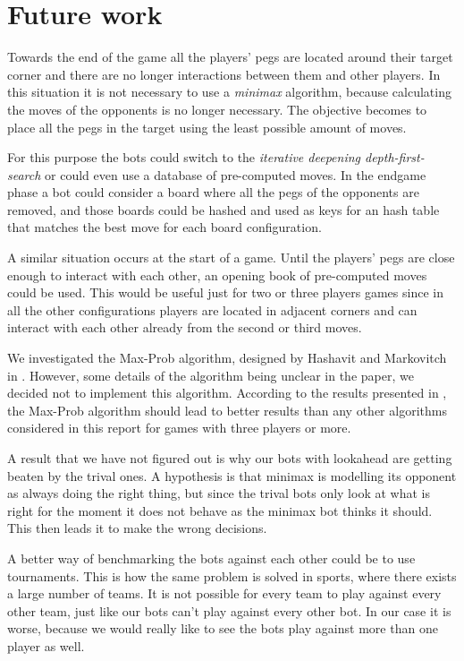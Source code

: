 
\section{Future work}

Towards the end of the game all the players' pegs are located around
their target corner and there are no longer interactions between them
and other players. In this situation it is not necessary to use a
\emph{minimax} algorithm, because calculating the moves of the
opponents is no longer necessary. The objective becomes to place
all the pegs in the target using the least possible amount of moves.

For this purpose the bots could switch to the \emph{iterative
  deepening depth-first-search} or could even use a database of
pre-computed moves. In the endgame phase a bot could consider a board
where all the pegs of the opponents are removed, and those boards
could be hashed and used as keys for an hash table that matches the
best move for each board configuration.

A similar situation occurs at the start of a game.
Until the players' pegs are close enough to interact with each other, an opening
book of pre-computed moves could be used. This would be useful just for two or
three players games since in all the other configurations players are located in
adjacent corners and can interact with each other already from the
second or third moves.

We investigated the Max-Prob algorithm, designed by Hashavit and
Mar\-ko\-vi\-tch in \cite{Hashavit}. However, some details of the
algorithm being unclear in the paper, we decided not to implement this
algorithm. According to the results presented in \cite{Hashavit}, the
Max-Prob algorithm should lead to better results than any other
algorithms considered in this report for games with three players or
more.



A result that we have not figured out is why our bots with lookahead
are getting beaten by the trival ones. A hypothesis is that minimax is
modelling its opponent as always doing the right thing, but since the
trival bots only look at what is right for the moment it does not
behave as the minimax bot thinks it should. This then leads it to
make the wrong decisions.

A better way of benchmarking the bots against each other could be to
use tournaments. This is how the same problem is solved in sports,
where there exists a large number of teams. It is not possible for
every team to play against every other team, just like our bots can't
play against every other bot. In our case it is worse, because we
would really like to see the bots play against more than one player as
well.
